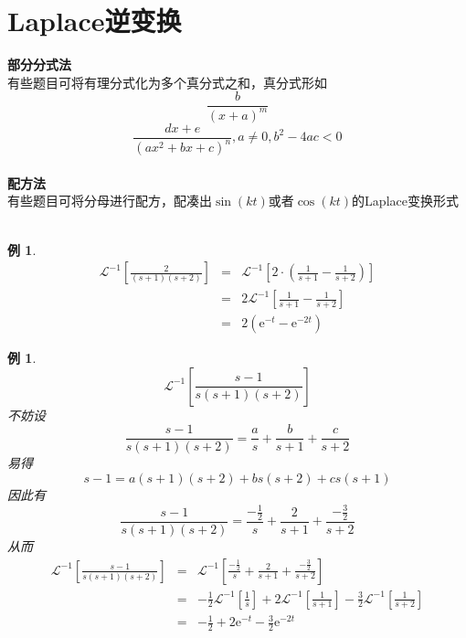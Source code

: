 \documentclass[12pt, a4paper, twoside]{ctexbook}
\newtheorem{example}[theorem]{例}
\begin{document}
\section{Laplace逆变换}
\textbf{部分分式法}\\
有些题目可将有理分式化为多个真分式之和，真分式形如
$$
\frac{b}{\left(x+a\right)^m}
$$
$$
\frac{dx+e}{\left(ax^2+bx+c\right)^n}, a\ne0, b^2-4ac<0
$$
~\\

\textbf{配方法}\\
有些题目可将分母进行配方，配凑出$\sin\left(kt\right)$或者$\cos\left(kt\right)$的Laplace变换形式
~\\

\begin{example}
    \begin{eqnarray}
        \mathscr{L}^{-1}\left[\frac{2}{\left(s+1\right)\left(s+2\right)}\right]&=&\mathscr{L}^{-1}\left[2\cdot\left(\frac{1}{s+1}-\frac{1}{s+2}\right)\right] \nonumber      \\
        ~&=&2\mathscr{L}^{-1}\left[\frac{1}{s+1}-\frac{1}{s+2}\right] \nonumber    \\
        ~&=&2\left(\mathrm{e}^{-t}-\mathrm{e}^{-2t}\right) \nonumber
    \end{eqnarray}
\end{example}
\begin{example}
    $$
    \mathscr{L}^{-1}\left[\frac{s-1}{s\left(s+1\right)\left(s+2\right)}\right]
    $$
    \hspace*{2em}不妨设
    $$
    \frac{s-1}{s\left(s+1\right)\left(s+2\right)}=\frac{a}{s}+\frac{b}{s+1}+\frac{c}{s+2}
    $$
    \hspace*{2em}易得
    $$
    s-1=a\left(s+1\right)\left(s+2\right)+bs\left(s+2\right)+cs\left(s+1\right)
    $$
    \hspace*{2em}因此有
    $$
    \frac{s-1}{s\left(s+1\right)\left(s+2\right)}=\frac{-\frac{1}{2}}{s}+\frac{2}{s+1}+\frac{-\frac{3}{2}}{s+2}
    $$
    \hspace*{2em}从而
    \begin{eqnarray}
        \mathscr{L}^{-1}\left[\frac{s-1}{s\left(s+1\right)\left(s+2\right)}\right]&=&\mathscr{L}^{-1}\left[\frac{-\frac{1}{2}}{s}+\frac{2}{s+1}+\frac{-\frac{3}{2}}{s+2}\right] \nonumber      \\
        ~&=&-\frac{1}{2}\mathscr{L}^{-1}\left[\frac{1}{s}\right]+2\mathscr{L}^{-1}\left[\frac{1}{s+1}\right]-\frac{3}{2}\mathscr{L}^{-1}\left[\frac{1}{s+2}\right] \nonumber    \\
        ~&=&-\frac{1}{2}+2\mathrm{e}^{-t}-\frac{3}{2}\mathrm{e}^{-2t} \nonumber
    \end{eqnarray}
\end{example}
~\\
\end{document}
